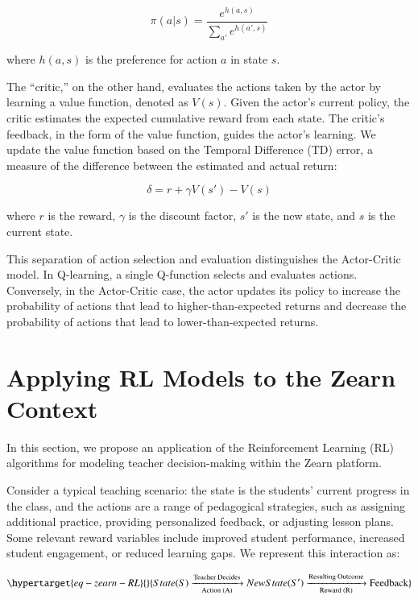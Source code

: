 \documentclass[
  number,
  preprint,
  3p,
  onecolumn]{elsarticle}
\begin{document}
\[
\pi(a|s) = \frac{e^{h(a, s)}}{\sum_{a'} e^{h(a', s)}}
\]

where \(h(a, s)\) is the preference for action \(a\) in state \(s\).

The ``critic,'' on the other hand, evaluates the actions taken by the
actor by learning a value function, denoted as \(V(s)\). Given the
actor's current policy, the critic estimates the expected cumulative
reward from each state. The critic's feedback, in the form of the value
function, guides the actor's learning. We update the value function
based on the Temporal Difference (TD) error, a measure of the difference
between the estimated and actual return:

\[
\delta = r + \gamma V(s') - V(s)
\]

where \(r\) is the reward, \(\gamma\) is the discount factor, \(s'\) is
the new state, and \(s\) is the current state.

This separation of action selection and evaluation distinguishes the
Actor-Critic model. In Q-learning, a single Q-function selects and
evaluates actions. Conversely, in the Actor-Critic case, the actor
updates its policy to increase the probability of actions that lead to
higher-than-expected returns and decrease the probability of actions
that lead to lower-than-expected returns.

\hypertarget{applying-rl-models-to-the-zearn-context}{%
\section{Applying RL Models to the Zearn
Context}\label{applying-rl-models-to-the-zearn-context}}

In this section, we propose an application of the Reinforcement Learning
(RL) algorithms for modeling teacher decision-making within the Zearn
platform.

Consider a typical teaching scenario: the state is the students' current
progress in the class, and the actions are a range of pedagogical
strategies, such as assigning additional practice, providing
personalized feedback, or adjusting lesson plans. Some relevant reward
variables include improved student performance, increased student
engagement, or reduced learning gaps. We represent this interaction as:

\begin{equation}\protect\hypertarget{eq-zearn-RL}{}{
State (S) \xrightarrow[\text{Action (A)}]{\text{Teacher Decides}} New State (S') \xrightarrow[\text{Reward (R)}]{\text{Resulting Outcome}} \text{Feedback}
}\label{eq-zearn-RL}\end{equation}
\end{document}
